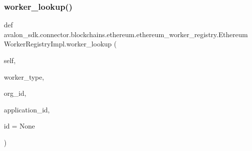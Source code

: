 \subsubsection{\texorpdfstring{worker\+\_\+lookup()}{worker\_lookup()}}
{\footnotesize\ttfamily def avalon\+\_\+sdk.\+connector.\+blockchains.\+ethereum.\+ethereum\+\_\+worker\+\_\+registry.\+Ethereum\+Worker\+Registry\+Impl.\+worker\+\_\+lookup (\begin{DoxyParamCaption}\item[{}]{self,  }\item[{}]{worker\+\_\+type,  }\item[{}]{org\+\_\+id,  }\item[{}]{application\+\_\+id,  }\item[{}]{id = {\ttfamily None} }\end{DoxyParamCaption})}


